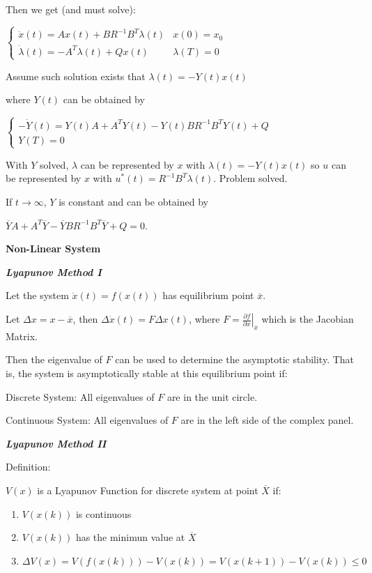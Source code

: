 \documentclass{article}
\newcommand{\bigtitle}[1]{
	\noindent
	\textbf{#1}
}
\newcommand{\smalltitle}[1]{
	\noindent
	\textbf{\textit{#1}}
}
\begin{document}
\begin{spacing}{1.2}
Then we get (and must solve):

$\left\{\begin{array}{ll}{\dot{x}(t)=A x(t)+B R^{-1} B^{T} \lambda(t)} & {x(0)=x_{0}} \\ {\dot{\lambda}(t)=-A^{T} \lambda(t)+Q x(t)} & {\lambda(T)=0}\end{array}\right.$

Assume such solution exists that $\lambda(t)=-Y(t) x(t)$

where $Y(t)$ can be obtained by

$\left\{\begin{array}{l}{-\dot{Y}(t)=Y(t) A+A^{T} Y(t)-Y(t) B R^{-1} B^{T} Y(t)+Q} \\ {Y(T)=0}\end{array}\right.$

With $Y$ solved, $\lambda$ can be represented by $x$ with $\lambda(t)=-Y(t) x(t)$ so $u$ can be represented by $x$ with $u^{*}(t)=R^{-1} B^{T} \lambda(t)$. Problem solved.

If $t\rightarrow \infty$, $Y$ is constant and can be obtained by 

$\overline{Y} A+A^{T} \overline{Y}-\overline{Y} B R^{-1} B^{T} \overline{Y}+Q=0$.


\bigtitle{Non-Linear System}

\smalltitle{Lyapunov Method I}

Let the system $\dot{x}(t)=f(x(t))$ has equilibrium point $\overline{x}$.

Let $\Delta x = x - \overline{x}$, then $\Delta \dot{x}(t)=F \Delta x(t)$, where $F=\left.\frac{\partial f}{\partial x}\right|_{\overline{x}}$ which is the Jacobian Matrix.

Then the eigenvalue of $F$ can be used to determine the asymptotic stability. That is, the system is asymptotically stable at this equilibrium point if:

Discrete System: All eigenvalues of $F$ are in the unit circle.

Continuous System: All eigenvalues of $F$ are in the left side of the complex panel.


\smalltitle{Lyapunov Method II}


Definition: 

$V(x)$ is a Lyapunov Function for discrete system at point $\overline{X}$ if:

\begin{enumerate}
	\item $V(x(k))$ is continuous
	\item $V(x(k))$ has the minimun value at $\overline{X}$
	\item $\Delta V(x) = V(f(x(k))) - V(x(k)) = V(x(k+1)) - V(x(k))\leq 0 $
\end{enumerate}



\end{spacing}
\end{document}
